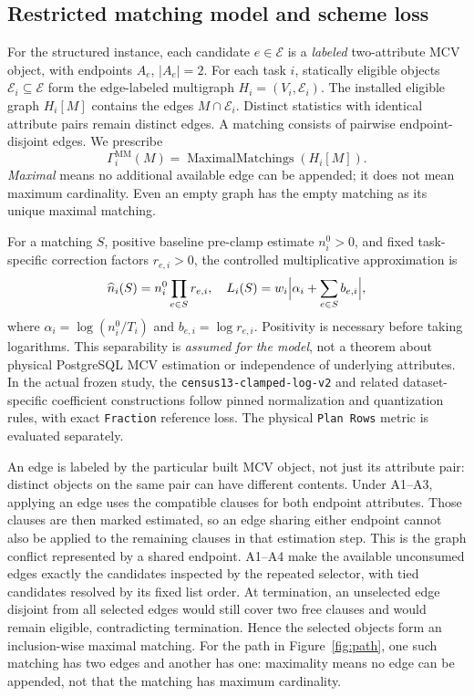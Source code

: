 \documentclass[sigconf, nonacm]{acmart}
\newcommand{\E}{\mathcal E}
\newcommand{\MM}{\operatorname{MaximalMatchings}}
\begin{document}
\subsection{Restricted matching model and scheme loss}
For the structured instance, each candidate \(e\in\E\) is a
\emph{labeled} two-attribute MCV object, with endpoints
\(A_e\), \(|A_e|=2\). For each task \(i\), statically
eligible objects \(\E_i\subseteq\E\) form the edge-labeled
multigraph \(H_i=(V_i,\E_i)\). The installed eligible graph
\(H_i[M]\) contains the edges \(M\cap\E_i\). Distinct
statistics with identical attribute pairs remain distinct edges.
A matching consists of pairwise endpoint-disjoint edges.
We prescribe
\begin{equation}
\label{eq:mm}
\Gamma_i^{\mathrm{MM}}(M)=\MM(H_i[M]).
\end{equation}
\emph{Maximal} means no additional available edge can be appended;
it does not mean maximum cardinality. Even an empty graph has
the empty matching as its unique maximal matching.

For a matching \(S\), positive baseline pre-clamp
estimate \(n_i^0>0\), and fixed task-specific correction
factors \(r_{e,i}>0\), the controlled multiplicative
approximation is
\begin{equation}
\label{eq:multiplicative}
\widehat n_i(S)=n_i^0\prod_{e\in S}r_{e,i},
\quad
L_i(S)=w_i\Bigl|\alpha_i+\sum_{e\in S}b_{e,i}\Bigr|,
\end{equation}
where \(\alpha_i=\log(n_i^0/T_i)\) and
\(b_{e,i}=\log r_{e,i}\).
Positivity is necessary before taking logarithms.
This separability is \emph{assumed for the model}, not a theorem
about physical PostgreSQL MCV estimation or independence of
underlying attributes. In the actual frozen study, the
\texttt{census13-clamped-log-v2} and related dataset-specific
coefficient constructions follow pinned normalization and
quantization rules, with exact \texttt{Fraction} reference loss.
The physical \texttt{Plan Rows} metric is evaluated separately.




An edge is labeled by the particular built MCV object, not
just its attribute pair: distinct objects on the same pair
can have different contents. Under A1--A3, applying an edge
uses the compatible clauses for both endpoint attributes.
Those clauses are then marked estimated, so an edge sharing
either endpoint cannot also be applied to the remaining
clauses in that estimation step. This is the graph conflict
represented by a shared endpoint. A1--A4 make the available
unconsumed edges exactly the candidates inspected by the
repeated selector, with tied candidates resolved by its fixed
list order. At termination, an unselected edge disjoint from
all selected edges would still cover two free clauses and
would remain eligible, contradicting termination. Hence the
selected objects form an inclusion-wise maximal matching.
For the path in Figure~\ref{fig:path}, one such matching has
two edges and another has one: maximality means no edge can
be appended, not that the matching has maximum cardinality.
\end{document}
